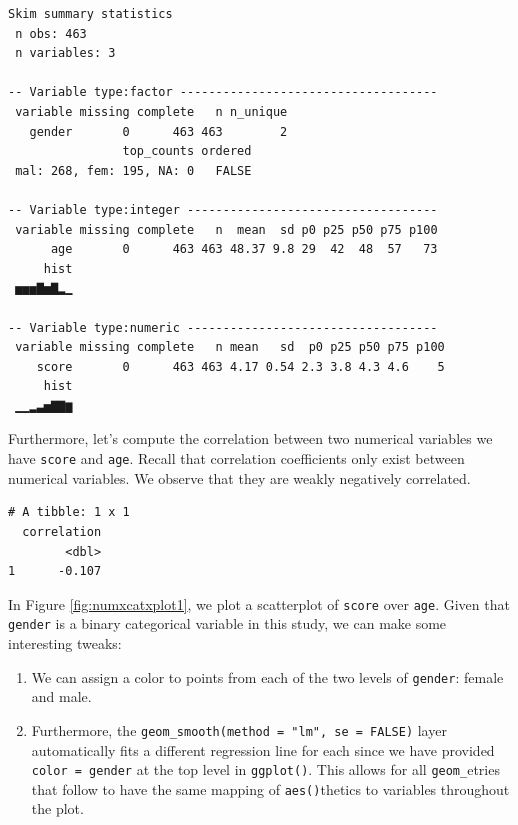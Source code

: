 \documentclass[12pt,]{krantz}
\makeatletter
\newenvironment{Shaded}{\begin{snugshade}}{\end{snugshade}}
\newcommand{\KeywordTok}[1]{\textcolor[rgb]{0.27,0.27,0.27}{\textbf{#1}}}
\newcommand{\DataTypeTok}[1]{\textcolor[rgb]{0.27,0.27,0.27}{#1}}
\newcommand{\StringTok}[1]{\textcolor[rgb]{0.5,0.5,0.5}{#1}}
\newcommand{\OperatorTok}[1]{\textcolor[rgb]{0.43,0.43,0.43}{\textbf{#1}}}
\newcommand{\NormalTok}[1]{#1}
\providecommand{\tightlist}{%
  \setlength{\itemsep}{0pt}\setlength{\parskip}{0pt}}
\newenvironment{kframe}{%
\medskip{}
\setlength{\fboxsep}{.8em}
 \def\at@end@of@kframe{}%
 \ifinner\ifhmode%
  \def\at@end@of@kframe{\end{minipage}}%
  \begin{minipage}{\columnwidth}%
 \fi\fi%
 \def\FrameCommand##1{\hskip\@totalleftmargin \hskip-\fboxsep
 \colorbox{shadecolor}{##1}\hskip-\fboxsep
     \hskip-\linewidth \hskip-\@totalleftmargin \hskip\columnwidth}%
 \MakeFramed {\advance\hsize-\width
   \@totalleftmargin\z@ \linewidth\hsize
   \@setminipage}}%
 {\par\unskip\endMakeFramed%
 \at@end@of@kframe}
\renewenvironment{Shaded}{\begin{kframe}}{\end{kframe}}
\theoremstyle{definition}
\theoremstyle{definition}
\theoremstyle{definition}
\theoremstyle{remark}
\makeatother
\begin{document}
\begin{verbatim}
Skim summary statistics
 n obs: 463 
 n variables: 3 

-- Variable type:factor ------------------------------------
 variable missing complete   n n_unique
   gender       0      463 463        2
                top_counts ordered
 mal: 268, fem: 195, NA: 0   FALSE

-- Variable type:integer -----------------------------------
 variable missing complete   n  mean  sd p0 p25 p50 p75 p100
      age       0      463 463 48.37 9.8 29  42  48  57   73
     hist
 ▅▅▅▇▅▇▂▁

-- Variable type:numeric -----------------------------------
 variable missing complete   n mean   sd  p0 p25 p50 p75 p100
    score       0      463 463 4.17 0.54 2.3 3.8 4.3 4.6    5
     hist
 ▁▁▂▃▅▇▇▆
\end{verbatim}

Furthermore, let's compute the correlation between two numerical
variables we have \texttt{score} and \texttt{age}. Recall that
correlation coefficients only exist between numerical variables. We
observe that they are weakly negatively correlated.

\begin{Shaded}
\end{Shaded}

\begin{verbatim}
# A tibble: 1 x 1
  correlation
        <dbl>
1      -0.107
\end{verbatim}

In Figure \ref{fig:numxcatxplot1}, we plot a scatterplot of
\texttt{score} over \texttt{age}. Given that \texttt{gender} is a binary
categorical variable in this study, we can make some interesting tweaks:

\begin{enumerate}
\def\labelenumi{\arabic{enumi}.}
\tightlist
\item
  We can assign a color to points from each of the two levels of
  \texttt{gender}: female and male.
\item
  Furthermore, the \texttt{geom\_smooth(method\ =\ "lm",\ se\ =\ FALSE)}
  layer automatically fits a different regression line for each since we
  have provided \texttt{color\ =\ gender} at the top level in
  \texttt{ggplot()}. This allows for all \texttt{geom\_}etries that
  follow to have the same mapping of \texttt{aes()}thetics to variables
  throughout the plot.
\end{enumerate}
\end{document}
